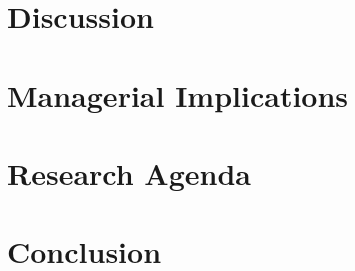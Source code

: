 \documentclass[journal]{IEEEtran}
\begin{document}
\section{Discussion}

\section{Managerial Implications}

\section{Research Agenda}

\section{Conclusion}



\end{document}

